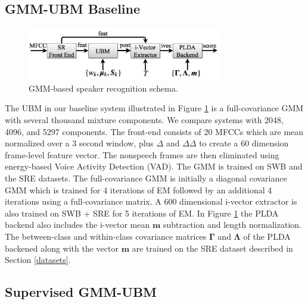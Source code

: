 \documentclass{article}
\begin{document}
\subsection{GMM-UBM Baseline}
\label{gmm_sys}

\begin{figure}[th]
\centerline{\includegraphics[width=8.5cm]{fig/baseline_schema}}
\caption{GMM-based speaker recognition schema.}
\label{fig:gmm_schema}
\end{figure}


The UBM in our baseline system illustrated in Figure \ref{fig:gmm_schema} 
is a full-covariance
GMM with several thousand mixture components. We compare systems with
2048, 4096, and 5297 components. The front-end consists of 20 MFCCs which
are mean normalized over a 3 second window, plus $\Delta$ 
and $\Delta \Delta$ to create a 60 dimension frame-level feature vector.
The nonspeech frames are then eliminated using
energy-based Voice Activity Detection (VAD). The GMM is trained on SWB
and the SRE datasets. The 
full-covariance GMM is initially a diagonal
covariance GMM which is trained for 4 iterations of EM followed by
an additional 4 iterations using a full-covariance matrix.
 A 600 dimensional i-vector extractor is also trained on 
SWB + SRE for 5 iterations of EM. In Figure \ref{fig:gmm_schema} the PLDA
backend also includes the i-vector mean $\boldsymbol{m}$ subtraction and
length normalization. The between-class and within-class
covariance matrices $\boldsymbol{\Gamma}$ and $\boldsymbol{\Lambda}$ of the PLDA backened along with
the vector $\boldsymbol{m}$ are trained on the SRE dataset described 
in Section \ref{datasets}.

\subsection{Supervised GMM-UBM}
\label{sup_gmm_sys}
\end{document}
